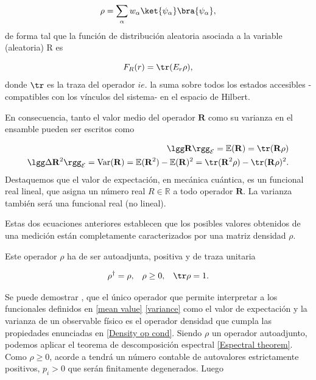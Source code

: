   \begin{equation}
      \rho = \sum_{\alpha} w_{\alpha} \ket{\psi_{\alpha}}\bra{\psi_{\alpha}},
  \end{equation}
  de forma tal que la función de distribución aleatoria asociada a la variable (aleatoria) R es
  
\begin{equation}
    F_R (r) = \tr(E_r \rho),
\end{equation}
  donde $\tr$ es la traza del operador $ie.$ la suma sobre todos los estados accesibles -compatibles con los vínculos del sistema- en el espacio de Hilbert.
  
  En consecuencia, tanto el valor medio del operador $\mathbf{R}$ como su varianza en el ensamble pueden ser escritos como
  
  \begin{align}
      \lgg \mathbf{R} \rgg_{\mathcal{E}} = \mathbb{E}(\mathbf{R})= \tr (\mathbf{R} \rho)
      \label{mean value}
      \\
      \lgg \Delta \mathbf{R}^2 \rgg_{\mathcal{E}} = \textnormal{Var} (\mathbf{R}) = \mathbb{E}(\mathbf{R}^2) - \mathbb{E}(\mathbf{R})^2 = \tr (\mathbf{R}^2 \rho) -  \tr (\mathbf{R}\rho)^2.
      \label{variance}
  \end{align}
Destaquemos que el valor de expectación, en mecánica cuántica, es un funcional real lineal, que asigna un número real $R \in \mathbb{R}$ a todo operador $\mathbf{R}$. La varianza también será una funcional real (no lineal).
 
 Estas dos ecuaciones anteriores establecen que los posibles valores obtenidos de una medición están completamente caracterizados por una matriz densidad $\rho$. 
 
 Este operador $\rho$ ha de ser autoadjunta, positiva y de traza unitaria \cite{VonNeumann:1955}
 
 \begin{align}
     \rho^\dagger & = \rho, & \rho & \geq 0, & \tr \rho = 1.
     \label{Density op cond}
 \end{align}
 
 Se puede demostrar \cite{VonNeumann:1955,Langerholc:1965},  que el único operador que permite interpretar a los funcionales definidos en \eqref{mean value} \eqref{variance} como el valor de expectación y la varianza de un observable físico es el operador densidad que cumpla las propiedades enunciadas en \eqref{Density op cond}. Siendo $\rho$ un operador autoadjunto, podemos aplicar el teorema de descomposición espectral \eqref{Espectral theorem}.
 Como $\rho \geq 0$, acorde a \cite{BCHallp} tendrá un número contable de autovalores estrictamente positivos, $p_i > 0$ que serán finitamente degenerados. Luego
 
